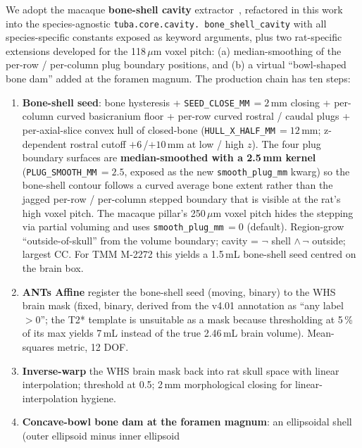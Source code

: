 \documentclass{compactarticle}
\begin{document}
We adopt the macaque \textbf{bone-shell cavity}
extractor~\cite{tuba-macaque}, refactored in this work into the
species-agnostic \texttt{tuba.\allowbreak core.\allowbreak cavity.\allowbreak
bone\_shell\_cavity} with all species-specific constants exposed as
keyword arguments, plus two rat-specific extensions developed for
the 118\,$\mu$m voxel pitch: (a) median-smoothing of the per-row /
per-column plug boundary positions, and (b) a virtual ``bowl-shaped
bone dam'' added at the foramen magnum. The production chain has ten
steps:
\begin{enumerate}[leftmargin=*]
\setlength\itemsep{0pt}
  \item \textbf{Bone-shell seed}: bone hysteresis +
        \texttt{SEED\_CLOSE\_MM}\,$=2$\,mm closing + per-column
        curved basicranium floor + per-row curved rostral / caudal
        plugs + per-axial-slice convex hull of closed-bone
        (\texttt{HULL\_X\_HALF\_MM}\,$=12$\,mm; z-dependent rostral
        cutoff $+6$\,/$+10$\,mm at low / high $z$). The four plug
        boundary surfaces are \textbf{median-smoothed with a 2.5\,mm
        kernel} (\texttt{PLUG\_SMOOTH\_MM}\,$=2.5$, exposed as the
        new \texttt{smooth\_plug\_mm} kwarg) so the bone-shell
        contour follows a curved average bone extent rather than
        the jagged per-row / per-column stepped boundary that is
        visible at the rat's high voxel pitch. The macaque pillar's
        250\,$\mu$m voxel pitch hides the stepping via partial
        voluming and uses \texttt{smooth\_plug\_mm}\,$=0$ (default).
        Region-grow ``outside-of-skull'' from the volume boundary;
        cavity = $\lnot$ shell $\land\,\lnot$ outside; largest CC.
        For TMM M-2272 this yields a 1.5\,mL bone-shell seed centred
        on the brain box.
  \item \textbf{ANTs Affine} register the bone-shell seed (moving,
        binary) to the WHS brain mask (fixed, binary, derived from
        the v4.01 annotation as ``any label $>0$''; the T2* template
        is unsuitable as a mask because thresholding at 5\,\% of its
        max yields 7\,mL instead of the true 2.46\,mL brain volume).
        Mean-squares metric, 12 DOF.
  \item \textbf{Inverse-warp} the WHS brain mask back into rat skull
        space with linear interpolation; threshold at 0.5; 2\,mm
        morphological closing for linear-interpolation hygiene.
  \item \textbf{Concave-bowl bone dam at the foramen magnum}: an
        ellipsoidal shell (outer ellipsoid minus inner ellipsoid

\end{enumerate}
\end{document}

